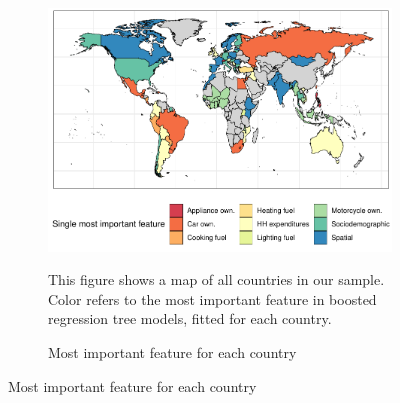 \clearpage

\begin{figure}[ht!]\ContinuedFloat
   \begin{subfigure}[b]{\textwidth}
  \centering
  \includegraphics{1_Figures/Figures_Appendix/Figure_Maps_3.pdf}
  \caption{Most important feature for each country} \label{fig:Map_3}
  \begin{subcaption2}
    This figure shows a map of all countries in our sample. Color refers to the most important feature in boosted regression tree models, fitted for each country.
  \end{subcaption2}
\end{subfigure}
\end{figure}

